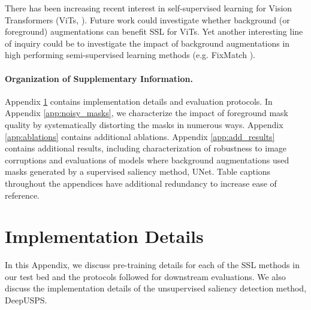\documentclass[twoside,11pt]{article}
\begin{document}
There has been increasing recent interest \citep{chen_empirical_2021,caron_emerging_2021,li_efficient_2021} in self-supervised learning for Vision Transformers (ViTs, \citet{vit_dosovitskiy_2021}). Future work could investigate whether background (or foreground) augmentations can benefit SSL for ViTs. Yet another interesting line of inquiry could be to investigate the impact of background augmentations in high performing semi-supervised learning methods (e.g. FixMatch \citep{fixmatch_sohn_2020}). 





 




\appendix
\newpage

\clearpage
\onecolumn
\renewcommand\thesection{\Alph{section}}
\setcounter{section}{0}
\renewcommand\thefigure{A\arabic{figure}}
\setcounter{figure}{0}
\renewcommand\thetable{A\arabic{table}}
\setcounter{table}{0}

\label{sec:appendix}

\paragraph{Organization of Supplementary Information.} Appendix \ref{app:training_details} contains implementation details and evaluation protocols. In Appendix \ref{app:noisy_masks}, we characterize the impact of foreground mask quality by systematically distorting the masks in numerous ways. Appendix \ref{app:ablations} contains additional ablations. Appendix \ref{app:add_results} contains additional results, including characterization of robustness to image corruptions and evaluations of models where background augmentations used masks generated by a supervised saliency method, UNet. Table captions throughout the appendices have additional redundancy to increase ease of reference.


\section{Implementation Details} 
\label{app:training_details}
In this Appendix, we discuss pre-training details for each of the SSL methods in our test bed and the protocols followed for downstream evaluations. We also discuss the implementation details of the unsupervised saliency detection method, DeepUSPS. 
\end{document}
